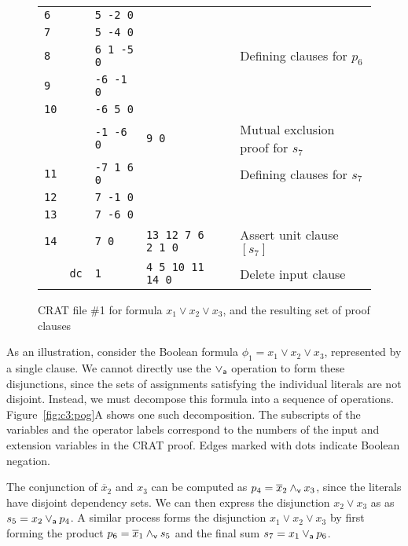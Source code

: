 \documentclass{llncs}
\newcommand{\pand}{\mathbin{\land_{\sf v}}}
\newcommand{\por}{\mathbin{\lor_{\sf a}}}
\newcommand{\obar}[1]{\overline{#1}}
\begin{document}
\begin{figure}
\begin{center}
\begin{tabular}{lcllll}
    {\tt 6} &     & {\tt  5 -2 0}    &  &  \\  %
    {\tt 7} &     & {\tt  5 -4 0}    &  & &  \\  %
    {\tt 8} &     & {\tt 6  1 -5 0}  &    & & Defining clauses for $p_6$ \\ 
    {\tt 9} &     & {\tt -6 -1 0}    &  & &  \\  %
    {\tt 10} &     & {\tt -6 5 0}    &  & &  \\  %
            &     & {\tt -1 -6 0}   & {\tt 9 0}  & &  Mutual exclusion proof for $s_7$ \\
    {\tt 11} &     & {\tt -7 1 6 0}  &  & & Defining clauses for $s_7$ \\ 
    {\tt 12} &     & {\tt  7 -1 0}     & &  \\  %
    {\tt 13} &     & {\tt  7 -6 0}     & &  \\  %
    {\tt 14} &     & {\tt 7 0} & {\tt 13 12 7 6 2 1 0} & & Assert unit clause $[s_7]$ \\
             & {\tt dc}  & {\tt 1}  & {\tt 4 5 10 11 14 0} & & Delete input clause \\
  \end{tabular}
  \end{center}
  \caption{CRAT file \#1 for formula $x_1 \lor x_2 \lor x_3$, and the resulting set of proof clauses}
  \label{fig:c3:crat}
\end{figure}
    
As an illustration, consider the Boolean formula
$\phi_1 = x_1 \lor x_2 \lor x_3$,
represented by a single clause.  We cannot directly use the
$\por$ operation to form these disjunctions, since the sets of assignments
satisfying the individual literals are not disjoint.  Instead, we must
decompose this formula into a sequence of operations.
Figure~\ref{fig:c3:pog}A shows one such decomposition.
The subscripts of the variables and the operator labels correspond to
the numbers of the input and extension variables in the CRAT proof.
Edges marked with dots indicate Boolean negation.

The conjunction of $\obar{x}_2$ and $x_3$ can be computed as $p_4 =
\obar{x}_2 \pand x_3$, since the literals have disjoint dependency
sets. We can then express the disjunction $x_2 \lor x_3$ as
as $s_5 = x_2 \por p_4$.  A similar process forms the
disjunction $x_1 \lor x_2 \lor x_3$ by first forming the product $p_6
= \obar{x}_1 \pand s_5$ and the final sum $s_7 = x_1 \por p_6$.
\end{document}
